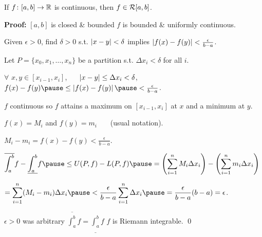 \documentclass[10pt,aspectratio=169]{beamer}
\begin{document}
\begin{frame}

\begin{lemma}
If $f \colon [a,b] \to {\mathbb{R}}$ is continuous,
then $f \in {\mathcal{R}}[a,b]$.
\end{lemma}

\pause
\textbf{Proof:}
$[a,b]$ is closed \& bounded
\pause
\hfill\thus\hfill $f$ is bounded \&
uniformly continuous.

\pause
Given $\epsilon > 0$, find $\delta > 0$ s.t.
$\left\lvert {x-y} \right\rvert < \delta$ implies $\left\lvert {f(x)-f(y)} \right\rvert < \frac{\epsilon}{b-a}$.

\pause
Let $P = \{ x_0, x_1, \ldots, x_n \}$
be a partition s.t. $\Delta x_i < \delta$ for all $i$.


\pause
\medskip

$\forall$ $x, y \in [x_{i-1},x_i]$, ~~
$\left\lvert {x-y} \right\rvert \leq \Delta x_i < \delta$,
\pause
\wthus
$
f(x)-f(y)
\pause
\leq
\abs{f(x)-f(y)}
\pause
<
\frac{\epsilon}{b-a}$.

\pause
\medskip

$f$ continuous so 
$f$ attains a maximum on $[x_{i-1},x_i]$ at $x$ and
a minimum at $y$.

\pause
\thus \quad $f(x) = M_i$ and $f(y) = m_i$ ~~~(usual notation).

\pause
\medskip

\thus\quad
$M_i-m_i = f(x)-f(y) < \frac{\epsilon}{b-a}$.

\pause
\medskip

\thus\quad
$\displaystyle
\overline{\int_a^b} f - 
\underline{\int_a^b} f 
\pause
\leq
U(P,f) - L(P,f)
\pause
=
\left(
\sum_{i=1}^n
M_i \Delta x_i
\right)
-
\left(
\sum_{i=1}^n
m_i \Delta x_i
\right)
$

\pause
\medskip

\qquad\qquad
$\displaystyle
=
\sum_{i=1}^n
(M_i-m_i) \Delta x_i
\pause
<
\frac{\epsilon}{b-a}
\sum_{i=1}^n
\Delta x_i
\pause
=
\frac{\epsilon}{b-a} (b-a)
= \epsilon$.

\pause
\medskip

$\epsilon > 0$ was arbitrary
\pause
\wthus
$\overline{\int_a^b} f = \underline{\int_a^b} f$
\pause
\wthus
$f$ is Riemann integrable.
\qed

\end{frame}
\end{document}
